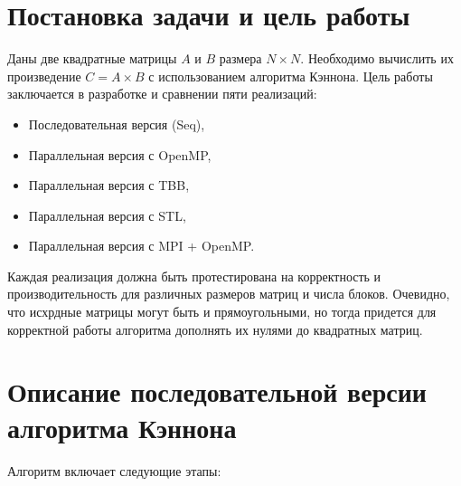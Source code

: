 \documentclass[a4paper,12pt]{article}
\begin{document}
\section{Постановка задачи и цель работы}
Даны две квадратные матрицы $A$ и $B$ размера $N \times N$. Необходимо вычислить их произведение $C = A \times B$ с использованием алгоритма Кэннона. Цель работы заключается в разработке и сравнении пяти реализаций:
\begin{itemize}
    \item Последовательная версия (Seq),
    \item Параллельная версия с OpenMP,
    \item Параллельная версия с TBB,
    \item Параллельная версия с STL,
    \item Параллельная версия с MPI + OpenMP.
\end{itemize}
Каждая реализация должна быть протестирована на корректность и производительность для различных размеров матриц и числа блоков. Очевидно, что исхрдные матрицы могут быть и прямоугольными, но тогда придется для корректной работы алгоритма дополнять их нулями до квадратных матриц.

\section{Описание последовательной версии алгоритма Кэннона}

Алгоритм включает следующие этапы:
\end{document}
